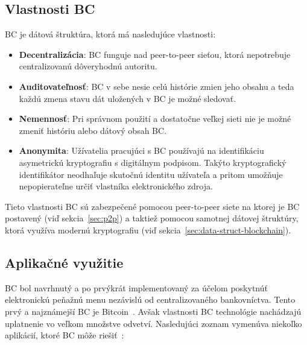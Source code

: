 \subsection{Vlastnosti BC}
BC je dátová štruktúra, ktorá má nasledujúce vlastnosti:
\begin{itemize}
	\item \textbf{Decentralizácia}: BC funguje nad peer-to-peer sieťou, ktorá nepotrebuje centralizovanú dôveryhodnú autoritu.
	\item \textbf{Auditovateľnosť}: BC v sebe nesie celú histórie zmien jeho obsahu a teda každú zmena stavu dát uložených v BC je možné sledovať.
	\item \textbf{Nemennosť}: Pri správnom použití a dostatočne veľkej sieti nie je možné zmeniť históriu alebo dátový obsah BC.
	\item \textbf{Anonymita}: Užívatelia pracujúci s BC používajú na identifikáciu asymetrickú kryptografiu s digitálnym podpisom. Takýto kryptografický identifikátor neodhaľuje skutočnú identitu užívateľa a pritom umožňuje nepopierateľne určiť vlastníka elektronického zdroja.
\end{itemize}

Tieto vlastnosti BC sú zabezpečené pomocou peer-to-peer siete na ktorej je BC postavený (viď sekcia~\ref{sec:p2p}) a taktiež pomocou samotnej dátovej štruktúry, ktorá využíva modernú kryptografiu (viď sekcia~\ref{sec:data-struct-blockchain}).~\cite{horizenAcademy}

\subsection{Aplikačné využitie}

BC bol navrhnutý a po prvýkrát implementovaný za účelom poskytnúť elektronickú peňažnú menu nezávislú od centralizovaného bankovníctva. Tento prvý a najznámejší BC je Bitcoin~\cite{satoshiBitcoin}. Avšak vlastnosti BC technológie nachádzajú uplatnenie vo veľkom množstve odvetví. Nasledujúci zoznam vymenúva niekoľko aplikácií, ktoré BC môže riešiť~\cite{homoliakBlockchain}:

